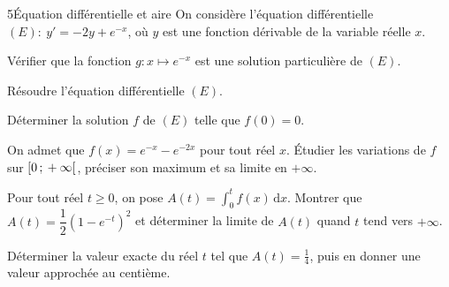 \begin{exoBac}{5}{Équation différentielle et aire}
On considère l'équation différentielle $(E):\ y'=-2y+e^{-x}$, où $y$ est une fonction dérivable de la variable réelle $x$.
\begin{questions}
  \item Vérifier que la fonction $g:x\mapsto e^{-x}$ est une solution particulière de $(E)$.
  \item Résoudre l'équation différentielle $(E)$.
  \item Déterminer la solution $f$ de $(E)$ telle que $f(0)=0$.
  \item On admet que $f(x)=e^{-x}-e^{-2x}$ pour tout réel $x$. Étudier les variations de $f$ sur $\mathopen{[}0\,{;}\,+\infty\mathclose{[}$, préciser son
    maximum et sa limite en $+\infty$.
  \item Pour tout réel $t\geq0$, on pose $A(t)=\displaystyle\int_0^{t}f(x)\,\mathrm{d}x$. Montrer que $A(t)=\dfrac12\left(1-e^{-t}\right)^{2}$
    et déterminer la limite de $A(t)$ quand $t$ tend vers $+\infty$.
  \item Déterminer la valeur exacte du réel $t$ tel que $A(t)=\frac14$, puis en donner une valeur approchée au centième.
\end{questions}
\end{exoBac}
